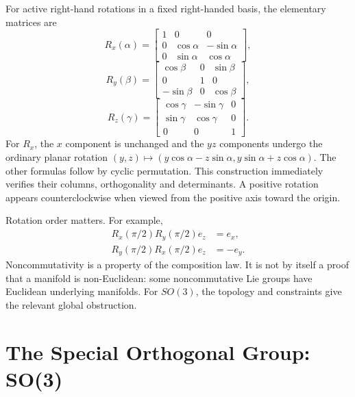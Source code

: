 For active right-hand rotations in a fixed right-handed basis, the elementary matrices are
\begin{equation}
 R_x(\alpha)=\begin{bmatrix}1&0&0\\0&\cos\alpha&-\sin\alpha\\0&\sin\alpha&\cos\alpha\end{bmatrix},
 \label{eq:Rx}
\end{equation}
\begin{equation}
 R_y(\beta)=\begin{bmatrix}\cos\beta&0&\sin\beta\\0&1&0\\-\sin\beta&0&\cos\beta\end{bmatrix},
 \label{eq:Ry}
\end{equation}
\begin{equation}
 R_z(\gamma)=\begin{bmatrix}\cos\gamma&-\sin\gamma&0\\\sin\gamma&\cos\gamma&0\\0&0&1\end{bmatrix}.
 \label{eq:Rz}
\end{equation}
For $R_x$, the $x$ component is unchanged and the $yz$ components undergo the ordinary planar rotation $(y,z)\mapsto(y\cos\alpha-z\sin\alpha,y\sin\alpha+z\cos\alpha)$. The other formulas follow by cyclic permutation. This construction immediately verifies their columns, orthogonality and determinants. A positive rotation appears counterclockwise when viewed from the positive axis toward the origin.

Rotation order matters. For example,
\begin{equation}
\begin{aligned}
R_x(\pi/2)R_y(\pi/2)e_z&=e_x,\\
R_y(\pi/2)R_x(\pi/2)e_z&=-e_y.
\end{aligned}
\end{equation}
Noncommutativity is a property of the composition law. It is not by itself a proof that a manifold is non-Euclidean: some noncommutative Lie groups have Euclidean underlying manifolds. For $SO(3)$, the topology and constraints give the relevant global obstruction.

\section{The Special Orthogonal Group: SO(3)}
\label{sec:SO3}

